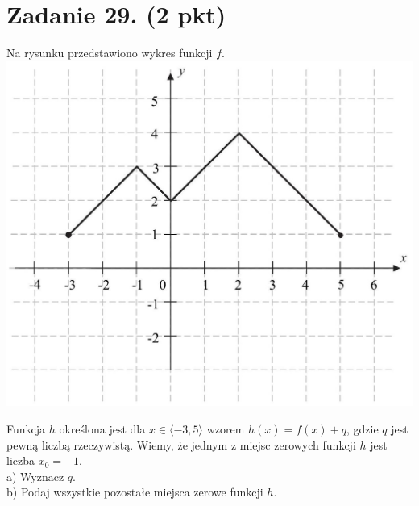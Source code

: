 \documentclass[10pt]{article}
\begin{document}
\section*{Zadanie 29. (2 pkt)}
Na rysunku przedstawiono wykres funkcji \(f\).\\
\includegraphics[max width=\textwidth, center]{2024_11_21_e19607c15353cb4d7e48g-15(1)}

Funkcja \(h\) określona jest dla \(x \in\langle-3,5\rangle\) wzorem \(h(x)=f(x)+q\), gdzie \(q\) jest pewną liczbą rzeczywistą. Wiemy, że jednym z miejsc zerowych funkcji \(h\) jest liczba \(x_{0}=-1\).\\
a) Wyznacz \(q\).\\
b) Podaj wszystkie pozostałe miejsca zerowe funkcji \(h\).
\end{document}
